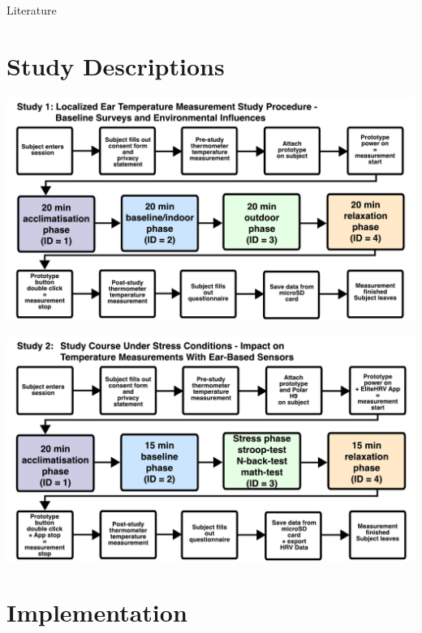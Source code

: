 \documentclass[en]{sdqbeamer}
\begin{document}
\appendix
\beginbackup


\begin{frame}{Literature}
    \printbibliography
\end{frame}

\section{Study Descriptions}
\begin{frame}
    \begin{center}
        \includegraphics[width=0.9\linewidth]{../thesis-doc/images/study1/Procedure.pdf} %
    \end{center}
\end{frame}

\begin{frame}
    \begin{center}
        \includegraphics[width=0.9\linewidth]{../thesis-doc/images/study2/Procedure2.pdf} %
    \end{center}
\end{frame}

\section{Implementation}
\end{document}
